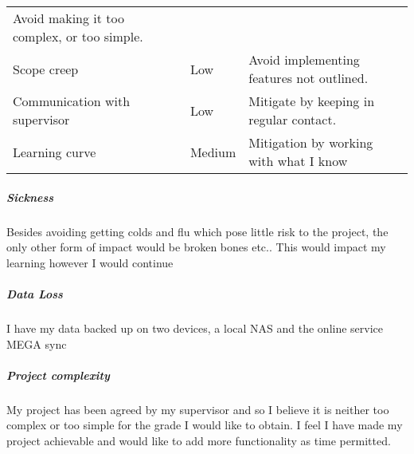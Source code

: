 \begin{longtable}[]{@{}lll@{}}
\begin{minipage}[t]{0.50\columnwidth}
Avoid making it too complex, or too simple.\strut
\end{minipage}\tabularnewline
\begin{minipage}[t]{0.28\columnwidth}\raggedright\strut
Scope creep\strut
\end{minipage} & \begin{minipage}[t]{0.13\columnwidth}\raggedright\strut
Low\strut
\end{minipage} & \begin{minipage}[t]{0.50\columnwidth}\raggedright\strut
Avoid implementing features not outlined.\strut
\end{minipage}\tabularnewline
\begin{minipage}[t]{0.28\columnwidth}\raggedright\strut
Communication with supervisor\strut
\end{minipage} & \begin{minipage}[t]{0.13\columnwidth}\raggedright\strut
Low\strut
\end{minipage} & \begin{minipage}[t]{0.50\columnwidth}\raggedright\strut
Mitigate by keeping in regular contact.\strut
\end{minipage}\tabularnewline
\begin{minipage}[t]{0.28\columnwidth}\raggedright\strut
Learning curve\strut
\end{minipage} & \begin{minipage}[t]{0.13\columnwidth}\raggedright\strut
Medium\strut
\end{minipage} & \begin{minipage}[t]{0.50\columnwidth}\raggedright\strut
Mitigation by working with what I know\strut
\end{minipage}\tabularnewline
\bottomrule
\end{longtable}

\subparagraph{Sickness}\label{sickness}

Besides avoiding getting colds and flu which pose little risk to the
project, the only other form of impact would be broken bones etc.. This
would impact my learning however I would continue

\subparagraph{Data Loss}\label{data-loss}

I have my data backed up on two devices, a local NAS and the online
service MEGA sync \cite{mega}

\subparagraph{Project complexity}\label{project-complexity}

My project has been agreed by my supervisor and so I believe it is
neither too complex or too simple for the grade I would like to obtain.
I feel I have made my project achievable and would like to add more
functionality as time permitted.


